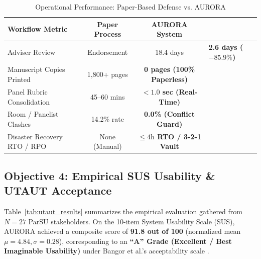 \documentclass[sigplan,screen,nonacm]{acmart}
\begin{document}
\begin{table}[htbp]
  \caption{Operational Performance: Paper-Based Defense vs. AURORA}
  \label{tab:efficiency}
  \centering
  \footnotesize
  \begin{tabular}{p{3.2cm}cc}
    \toprule
    \textbf{Workflow Metric} & \textbf{Paper Process} & \textbf{AURORA System} \\
    \midrule
    Adviser Review & Endorsement & 18.4 days & \textbf{2.6 days ($-85.9\%$)} \\
    Manuscript Copies Printed & 1,800+ pages & \textbf{0 pages (100\% Paperless)} \\
    Panel Rubric Consolidation & 45--60 mins & \textbf{$< 1.0$ sec (Real-Time)} \\
    Room / Panelist Clashes & 14.2\% rate & \textbf{0.0\% (Conflict Guard)} \\
    Disaster Recovery RTO / RPO & None (Manual) & \textbf{$\le 4\text{h}$ RTO / 3-2-1 Vault} \\
    \bottomrule
  \end{tabular}
\end{table}

\subsection{Objective 4: Empirical SUS Usability & UTAUT Acceptance}
Table~\ref{tab:utaut_results} summarizes the empirical evaluation gathered from $N = 27$ ParSU stakeholders. On the 10-item System Usability Scale (SUS), AURORA achieved a composite score of \textbf{91.8 out of 100} (normalized mean $\mu = 4.84, \sigma = 0.28$), corresponding to an \textbf{``A'' Grade (Excellent / Best Imaginable Usability)} under Bangor et al.'s acceptability scale \cite{bangor2009determining}.
\end{document}
